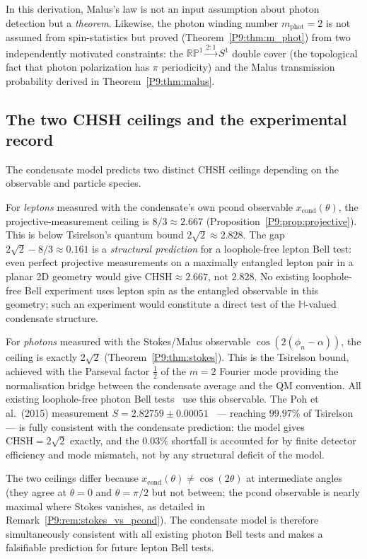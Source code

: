 \documentclass[11pt,a4paper]{article}
\theoremstyle{definition}
\theoremstyle{remark}
\newcommand{\HH}{\mathbb{H}}
\newcommand{\xcond}{x_{\mathrm{cond}}}
\newcommand{\CHSH}{\mathrm{CHSH}}
\begin{document}
In this derivation, Malus's law is not an input assumption about photon
detection but a \emph{theorem}.
Likewise, the photon winding number $m_\mathrm{phot}=2$ is not assumed
from spin-statistics but proved (Theorem~\ref{P9:thm:m_phot}) from two
independently motivated constraints: the $\mathbb{RP}^1\xrightarrow{2:1}S^1$
double cover (the topological fact that photon polarization has $\pi$
periodicity) and the Malus transmission probability derived in
Theorem~\ref{P9:thm:malus}.
 
\subsection{The two CHSH ceilings and the experimental record}
 
The condensate model predicts two distinct CHSH ceilings depending on
the observable and particle species.
 
For \emph{leptons} measured with the condensate's own pcond observable
$\xcond(\theta)$, the projective-measurement ceiling is
$8/3\approx2.667$ (Proposition~\ref{P9:prop:projective}).
This is below Tsirelson's quantum bound $2\sqrt{2}\approx2.828$.
The gap $2\sqrt{2}-8/3\approx0.161$ is a \emph{structural prediction}
for a loophole-free lepton Bell test: even perfect projective measurements
on a maximally entangled lepton pair in a planar 2D geometry would give
$\CHSH\approx2.667$, not $2.828$.
No existing loophole-free Bell experiment uses lepton spin as the
entangled observable in this geometry; such an experiment would
constitute a direct test of the $\HH$-valued condensate structure.
 
For \emph{photons} measured with the Stokes/Malus observable
$\cos(2(\phi_n-\alpha))$, the ceiling is exactly $2\sqrt{2}$
(Theorem~\ref{P9:thm:stokes}).
This is the Tsirelson bound, achieved with the Parseval factor
$\tfrac{1}{2}$ of the $m=2$ Fourier mode providing the normalisation
bridge between the condensate average and the QM convention.
All existing loophole-free photon Bell tests~\cite{Hensen2015,Giustina2015,Shalm2015}
use this observable.
The Poh et al.\ (2015) measurement $S=2.82759\pm0.00051$~\cite{Poh2015}
--- reaching $99.97\%$ of Tsirelson --- is fully consistent with the
condensate prediction: the model gives $\CHSH=2\sqrt{2}$ exactly, and
the $0.03\%$ shortfall is accounted for by finite detector efficiency
and mode mismatch, not by any structural deficit of the model.
 
The two ceilings differ because $\xcond(\theta)\neq\cos(2\theta)$
at intermediate angles (they agree at $\theta=0$ and $\theta=\pi/2$
but not between; the pcond observable is nearly maximal where Stokes
vanishes, as detailed in Remark~\ref{P9:rem:stokes_vs_pcond}).
The condensate model is therefore simultaneously consistent with all
existing photon Bell tests and makes a falsifiable prediction for future
lepton Bell tests.
 
\end{document}
